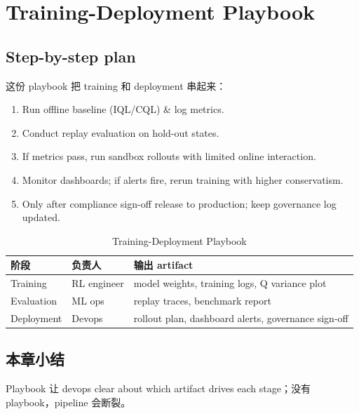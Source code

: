 \section{Training-Deployment Playbook}

\subsection{Step-by-step plan}

这份 playbook 把 training 和 deployment 串起来：

\begin{enumerate}
    \item Run offline baseline (IQL/CQL) & log metrics.
    \item Conduct replay evaluation on hold-out states.
    \item If metrics pass, run sandbox rollouts with limited online interaction.
    \item Monitor dashboards; if alerts fire, rerun training with higher conservatism.
    \item Only after compliance sign-off release to production; keep governance log updated.
\end{enumerate}

\begin{table}[H]
\centering
\begin{tabular}{p{} p{} p{}}
\toprule
阶段 & 负责人 & 输出 artifact \\
\midrule
Training & RL engineer & model weights, training logs, Q variance plot \\
Evaluation & ML ops & replay traces, benchmark report \\
Deployment & Devops & rollout plan, dashboard alerts, governance sign-off \\
\bottomrule
\end{tabular}
\caption{Training-Deployment Playbook}
\end{table}

\subsection{本章小结}

Playbook 让 devops clear about which artifact drives each stage；没有 playbook，pipeline 会断裂。

